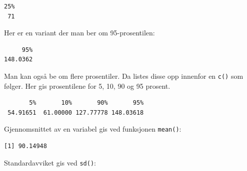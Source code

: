 \documentclass[
  letterpaper,
  DIV=11,
  numbers=noendperiod]{scrreprt}
\newenvironment{Shaded}{\begin{snugshade}}{\end{snugshade}}
\newcommand{\AttributeTok}[1]{\textcolor[rgb]{0.40,0.45,0.13}{#1}}
\newcommand{\ConstantTok}[1]{\textcolor[rgb]{0.56,0.35,0.01}{#1}}
\newcommand{\DecValTok}[1]{\textcolor[rgb]{0.68,0.00,0.00}{#1}}
\newcommand{\FunctionTok}[1]{\textcolor[rgb]{0.28,0.35,0.67}{#1}}
\newcommand{\NormalTok}[1]{\textcolor[rgb]{0.00,0.23,0.31}{#1}}
\newcommand{\SpecialCharTok}[1]{\textcolor[rgb]{0.37,0.37,0.37}{#1}}
\theoremstyle{definition}
\theoremstyle{remark}
\begin{document}
\begin{verbatim}
25% 
 71 
\end{verbatim}

Her er en variant der man ber om 95-prosentilen:

\begin{Shaded}
\end{Shaded}

\begin{verbatim}
     95% 
148.0362 
\end{verbatim}

Man kan også be om flere prosentiler. Da listes disse opp innenfor en
\texttt{c()} som følger. Her gis prosentilene for 5, 10, 90 og 95
prosent.

\begin{Shaded}
\end{Shaded}

\begin{verbatim}
       5%       10%       90%       95% 
 54.91651  61.00000 127.77778 148.03618 
\end{verbatim}

Gjennomsnittet av en variabel gis ved funksjonen \texttt{mean()}:

\begin{Shaded}
\end{Shaded}

\begin{verbatim}
[1] 90.14948
\end{verbatim}

Standardavviket gis ved \texttt{sd()}:

\begin{Shaded}
\end{Shaded}
\end{document}
